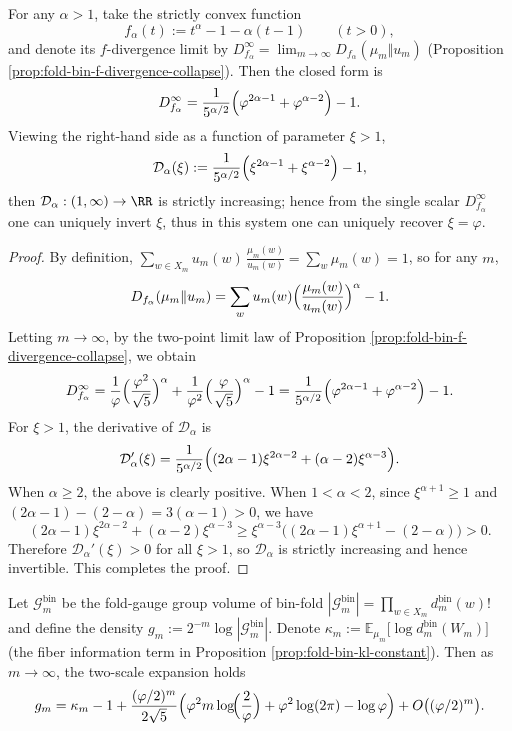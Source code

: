 \begin{proposition}\label{prop:fold-bin-phi-identifiable-power-divergence}
For any \(\alpha>1\), take the strictly convex function
\[
f_\alpha(t):=t^\alpha-1-\alpha(t-1)\qquad(t>0),
\]
and denote its \(f\)-divergence limit by \(D_{f_\alpha}^\infty=\lim_{m\to\infty}D_{f_\alpha}(\mu_m\Vert u_m)\) (Proposition \ref{prop:fold-bin-f-divergence-collapse}).
Then the closed form is
\[
D_{f_\alpha}^\infty
=\frac{1}{5^{\alpha/2}}\Bigl(\varphi^{2\alpha-1}+\varphi^{\alpha-2}\Bigr)-1.
\]
Viewing the right-hand side as a function of parameter \(\xi>1\),
\[
\mathcal{D}_\alpha(\xi):=\frac{1}{5^{\alpha/2}}\Bigl(\xi^{2\alpha-1}+\xi^{\alpha-2}\Bigr)-1,
\]
then \(\mathcal{D}_\alpha:(1,\infty)\to\RR\) is strictly increasing; hence from the single scalar \(D_{f_\alpha}^\infty\) one can uniquely invert \(\xi\), thus in this system one can uniquely recover \(\xi=\varphi\).
\end{proposition}
\begin{proof}
By definition, \(\sum_{w\in X_m}u_m(w)\,\frac{\mu_m(w)}{u_m(w)}=\sum_w \mu_m(w)=1\), so for any \(m\),
\[
D_{f_\alpha}(\mu_m\Vert u_m)=\sum_{w}u_m(w)\Bigl(\frac{\mu_m(w)}{u_m(w)}\Bigr)^\alpha-1.
\]
Letting \(m\to\infty\), by the two-point limit law of Proposition \ref{prop:fold-bin-f-divergence-collapse}, we obtain
\[
D_{f_\alpha}^\infty
=\frac{1}{\varphi}\Bigl(\frac{\varphi^2}{\sqrt5}\Bigr)^\alpha+\frac{1}{\varphi^2}\Bigl(\frac{\varphi}{\sqrt5}\Bigr)^\alpha-1
=\frac{1}{5^{\alpha/2}}\Bigl(\varphi^{2\alpha-1}+\varphi^{\alpha-2}\Bigr)-1.
\]
For \(\xi>1\), the derivative of \(\mathcal{D}_\alpha\) is
\[
\mathcal{D}_\alpha'(\xi)=\frac{1}{5^{\alpha/2}}\Bigl((2\alpha-1)\xi^{2\alpha-2}+(\alpha-2)\xi^{\alpha-3}\Bigr).
\]
When \(\alpha\ge 2\), the above is clearly positive.
When \(1<\alpha<2\), since \(\xi^{\alpha+1}\ge 1\) and
\(
(2\alpha-1)-(2-\alpha)=3(\alpha-1)>0
\), we have
\[
(2\alpha-1)\xi^{2\alpha-2}+(\alpha-2)\xi^{\alpha-3}
\ge \xi^{\alpha-3}\bigl((2\alpha-1)\xi^{\alpha+1}-(2-\alpha)\bigr)
>0.
\]
Therefore \(\mathcal{D}_\alpha'(\xi)>0\) for all \(\xi>1\), so \(\mathcal{D}_\alpha\) is strictly increasing and hence invertible. This completes the proof.
\end{proof}

\begin{proposition}\label{prop:fold-bin-gauge-density-two-scale}
Let \(\mathcal{G}^{\mathrm{bin}}_m\) be the fold-gauge group volume of bin-fold
\(
|\mathcal{G}^{\mathrm{bin}}_m|=\prod_{w\in X_m} d^{\mathrm{bin}}_m(w)!
\)
and define the density \(g_m:=2^{-m}\log|\mathcal{G}^{\mathrm{bin}}_m|\).
Denote
\(
\kappa_m:=\mathbb{E}_{\mu_m}\bigl[\log d^{\mathrm{bin}}_m(W_m)\bigr]
\)
(the fiber information term in Proposition \ref{prop:fold-bin-kl-constant}).
Then as \(m\to\infty\), the two-scale expansion holds
\[
g_m=\kappa_m-1+\frac{(\varphi/2)^m}{2\sqrt5}\Bigl(\varphi^2 m\log\!\Bigl(\frac{2}{\varphi}\Bigr)+\varphi^2\log(2\pi)-\log\varphi\Bigr)+O\bigl((\varphi/2)^m\bigr).
\]
\end{proposition}

